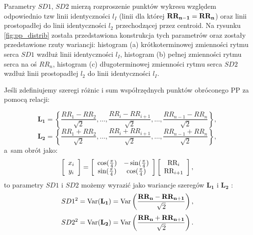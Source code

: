 
Parametry $SD1$, $SD2$ mierzą rozproszenie punktów wykresu
\PP{} względem odpowiednio tzw linii identyczności $l_{I}$ (linii dla której $\mathbf{RR_{n-1}} = \mathbf{RR_n}$)
oraz linii prostopadłej do linii identyczności $l_2$ przechodzącej przez centroid. Na
rysunku \ref{fig:pp_distrib} została przedstawiona konstrukcja tych parametrów oraz zostały
przedstawione rzuty wariancji: histogram (a) krótkoterminowej zmienności rytmu serca $SD1$
wzdłuż linii identyczności $l_{I}$, histogram (b) pełnej zmienności rytmu serca na oś $RR_n$,
histogram (c) długoterminowej zmienności rytmu serca $SD2$ wzdłuż linii prostopadłej $l_2$
do linii identyczności $l_{I}$.

Jeśli zdefiniujemy szeregi różnic i sum współrzędnych punktów obróconego PP za pomocą
relacji:


\begin{equation}
\mathbf{L_1} = \left \{ \frac{RR_1 - RR_{2}}{\sqrt{2}}, \ldots, \frac{RR_i - RR_{i+1}}{\sqrt{2}}, \ldots, \frac{RR_{n-1} - RR_{n}}{\sqrt{2}} \right \},
\end{equation}
\begin{equation}
\mathbf{L_2} = \left \{\frac{RR_1 + RR_{2}}{\sqrt{2}}, \ldots, \frac{RR_i + RR_{i+1}}{\sqrt{2}}, \ldots, \frac{RR_{n-1} + RR_{n}}{\sqrt{2}} \right \},
\end{equation}
a~sam obrót jako:
\begin{equation}
\left[
    \begin{array}{c}
      x_i\\
      y_i\\
    \end{array} \right] 
  = 
\left[ \begin{array}{c c}
      \cos(\frac{\pi}{4}) & -\sin(\frac{\pi}{4})\\
      \sin(\frac{\pi}{4}) & \cos(\frac{\pi}{4})\\
    \end{array} \right] 
\left[
    \begin{array}{c}
      \mbox{RR}_i\\
      \mbox{RR}_{i+1}\\
    \end{array} \right],
\end{equation}
to parametry $SD1$ i $SD2$ możemy wyrazić jako wariancje szeregów $\mathbf{L_1}$ i $\mathbf{L_2}$ \cite{poinc_jaro,jarek2}:
\begin{equation}
  SD1^2 = \mbox{Var}( \mathbf{L_1})
  = \mbox{Var}\left(\frac{\mathbf{RR_n} - \mathbf{RR_{n+1}}}{\sqrt{2}}\right),
  \label{eq:sd1}
\end{equation}
\begin{equation}
  SD2^2 = \mbox{Var}( \mathbf{L_2})
  = \mbox{Var}\left(\frac{\mathbf{RR_n} + \mathbf{RR_{n+1}}}{\sqrt{2}}\right). 
  \label{eq:sd2}
\end{equation}


